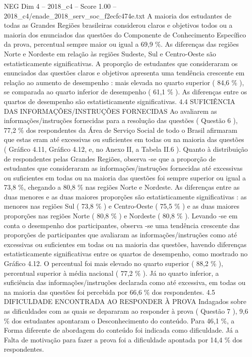 \begin{textsample}{NEG Dim 4 – 2018\_c4 – Score 1.00 – 2018\_c4/enade\_2018\_serv\_soc\_f2ecfc474e.txt}
A maioria dos estudantes de todas as Grandes Regiões brasileiras considerou claros e objetivos todos ou a maioria dos enunciados das questões do Componente de Conhecimento Específico da prova, percentual sempre maior ou igual a 69,9 \%.
As diferenças das regiões Norte e Nordeste em relação às regiões Sudeste, Sul e Centro-Oeste são estatisticamente significativas.
A proporção de estudantes que consideraram os enunciados das questões claros e objetivos apresenta uma tendência crescente em relação ao aumento de desempenho : mais elevada no quarto superior ( 84,6 \% ), se comparada ao quarto inferior de desempenho ( 61,1 \% ).
As diferenças entre os quartos de desempenho são estatisticamente significativas. 4.4 SUFICIÊNCIA DAS INFORMAÇÕES/INSTRUÇÕES FORNECIDAS Ao avaliarem as informações/instruções fornecidas para a resolução das questões ( Questão 6 ), 77,2 \% dos respondentes da Área de Serviço Social de todo o Brasil afirmaram que estas eram até excessivas ou suficientes em todas ou na maioria das questões ( Gráfico 4.11, Gráfico 4.12, e, no Anexo II, a Tabela II.6 ).
Quanto à distribuição de respondentes pelas Grandes Regiões, observa -se que a proporção de estudantes que consideraram as informações/instruções fornecidas até excessivas ou suficientes em todas ou na maioria das questões foi sempre superior ou igual a 73,8 \%, chegando a 80,8 \% nas regiões Norte e Nordeste.
As diferenças entre as duas menores e as duas maiores proporções são estatisticamente significativas : as menores nas regiões Sul ( 73,8 \% ) e Centro-Oeste ( 75,5 \% ) e as duas maiores proporções nas regiões Norte ( 80,8 \% ) e Nordeste ( 80,8 \% ).
Levando -se em conta o desempenho dos participantes, observa -se uma tendência crescente das proporções de participantes que avaliaram as informações/instruções como até excessivas ou suficientes em todas ou na maioria das questões, havendo diferenças estatisticamente significativas entre os quartos de desempenho, como mostrado no Gráfico 4.12.
O percentual foi mais elevado no quarto superior ( 88,2 \% ), percentual superior à média nacional ( 77,2 \% ).
Já no quarto inferior, a suficiência das informações/instruções declarada como até excessiva, em todas ou na maioria das questões foi percebida por 66,6 \% dos respondentes. 4.5 DIFICULDADE ENCONTRADA AO RESPONDER À PROVA Indagados sobre as dificuldades com as quais se depararam ao responder à prova ( Questão 7 ), 9,6 \% dos estudantes apontaram o Desconhecimento do conteúdo.
Para 46,1 \%, a Forma diferente de abordagem do conteúdo foi indicada como dificuldade.
Já a Falta de motivação para fazer a prova foi a dificuldade apontada por 14,4 \% dos respondentes.

\end{textsample}
